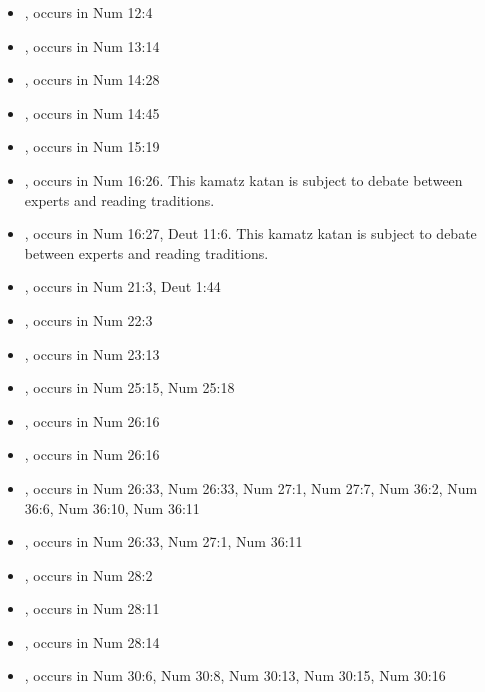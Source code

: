 \documentclass[14pt]{article}
\begin{document}
\begin{itemize}
\item {}, occurs in Num 12:4

\item {}, occurs in Num 13:14

\item {}, occurs in Num 14:28

\item {}, occurs in Num 14:45

\item {}, occurs in Num 15:19

\item {}, occurs in Num 16:26. This kamatz katan is subject to debate between experts and reading traditions.

\item {}, occurs in Num 16:27, Deut 11:6. This kamatz katan is subject to debate between experts and reading traditions.

\item {}, occurs in Num 21:3, Deut 1:44

\item {}, occurs in Num 22:3

\item {}, occurs in Num 23:13

\item {}, occurs in Num 25:15, Num 25:18

\item {}, occurs in Num 26:16

\item {}, occurs in Num 26:16

\item {}, occurs in Num 26:33, Num 26:33, Num 27:1, Num 27:7, Num 36:2, Num 36:6, Num 36:10, Num 36:11

\item {}, occurs in Num 26:33, Num 27:1, Num 36:11

\item {}, occurs in Num 28:2

\item {}, occurs in Num 28:11

\item {}, occurs in Num 28:14

\item {}, occurs in Num 30:6, Num 30:8, Num 30:13, Num 30:15, Num 30:16


\end{itemize}
\end{document}
